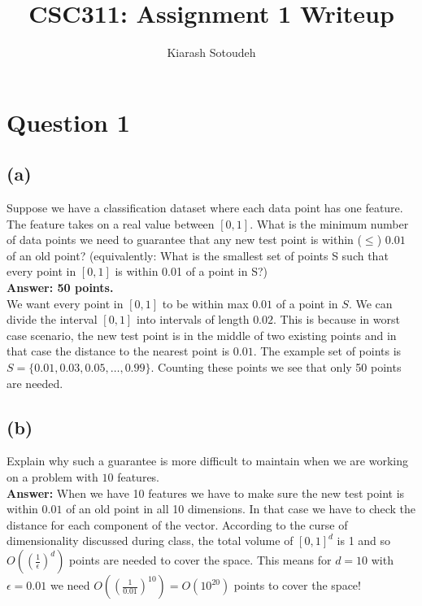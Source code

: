 \documentclass{article}
\title{CSC311: Assignment 1 Writeup}
\author{Kiarash Sotoudeh}
\date{}
\begin{document}
\maketitle

\section*{Question 1}
\subsection*{(a)} 
Suppose we have a classification dataset where each data point has one feature. The feature takes on a real value between $[0, 1]$. What is the minimum number of data points we need to guarantee that any new test point is within ($\leq$) $0.01$ of an old point? (equivalently: What is the smallest set of points S such that every point in $[0,1]$ is within 0.01 of a point in S?) \\
\color{answer}
\textbf{Answer: 50 points.} \\
We want every point in $[0, 1]$ to be within max $0.01$ of a point in $S$. We can divide the interval $[0, 1]$ into intervals of length $0.02$. This is because in worst case scenario, the new test point is in the middle of two existing points and in that case the distance to the nearest point is $0.01$. The example set of points is $S = \{0.01, 0.03, 0.05, \ldots, 0.99\}$. Counting these points we see that only 50 points are needed. \\ 
\color{black}


\subsection*{(b)}
Explain why such a guarantee is more difficult to maintain when we are working on a problem with $10$ features. \\
\color{answer}
\textbf{Answer:}
When we have 10 features we have to make sure the new test point is within $0.01$ of an old point in all 10 dimensions. In that case we have to check the distance for each component of the vector. According to the curse of dimensionality discussed during class, the total volume of $[0, 1]^d$ is 1 and so $O((\frac{1}{\epsilon})^d)$ points are needed to cover the space. This means for $d=10$ with $\epsilon=0.01$ we need $O((\frac{1}{0.01})^{10}) = O(10^{20})$ points to cover the space! 
\color{black}
\end{document}
